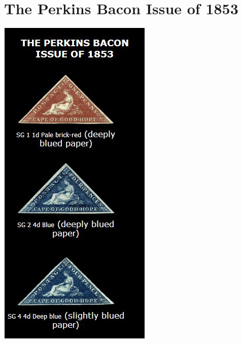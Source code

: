 \chapter{The Perkins Bacon Issue of 1853}

\begin{marginfigure} 
\includegraphics[width=.95\textwidth]{../cape-of-good-hope/adhesives/bacon-01.jpg}
\end{marginfigure}

